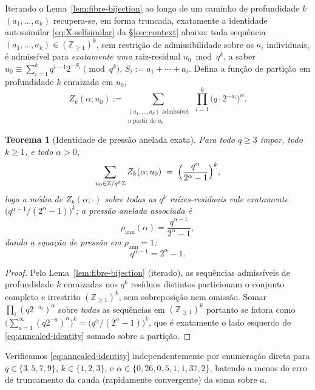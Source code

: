 \documentclass[11pt]{article}
\newtheorem{theorem}{Teorema}[section]
\theoremstyle{definition}
\theoremstyle{remark}
\begin{document}
Iterando o Lema~\ref{lem:fibre-bijection} ao longo de um caminho de
profundidade $k$ $(a_1,\dots,a_k)$ recupera-se, em forma truncada,
exatamente a identidade autossimilar \eqref{eq:X-selfsimilar} da
\S\ref{sec:context} abaixo: toda sequência
$(a_1,\dots,a_k)\in(\mathbb{Z}_{\ge1})^k$, sem restrição de
admissibilidade sobre os $a_i$ individuais, é admissível para
\emph{exatamente uma} raiz-residual $u_0\bmod q^k$, a saber
$u_0\equiv\sum_{i=1}^k q^{i-1}2^{-S_i}\pmod{q^k}$,
$S_i:=a_1+\cdots+a_i$. Defina a função de partição em profundidade $k$
enraizada em $u_0$,
\[
  Z_k(\alpha;u_0) := \sum_{\substack{(a_1,\dots,a_k)\text{ admissível}\\ \text{a partir de } u_0}} \ \prod_{i=1}^k \bigl(q\cdot2^{-a_i}\bigr)^\alpha .
\]

\begin{theorem}[Identidade de pressão anelada exata]\label{thm:pressure}
Para todo $q\ge3$ ímpar, todo $k\ge1$, e todo $\alpha>0$,
\begin{equation}\label{eq:annealed-identity}
  \sum_{u_0\in\mathbb{Z}/q^k\mathbb{Z}} Z_k(\alpha;u_0) \;=\; \Bigl(\frac{q^\alpha}{2^\alpha-1}\Bigr)^{k},
\end{equation}
logo a \emph{média} de $Z_k(\alpha;\cdot)$ sobre todas as $q^k$
raízes-residuais vale exatamente $\bigl(q^{\alpha-1}/(2^\alpha-1)\bigr)^k$;
a pressão anelada associada é
\begin{equation}\label{eq:pressure-closed-form}
  \rho_{\mathrm{ann}}(\alpha) = \frac{q^{\alpha-1}}{2^\alpha-1},
\end{equation}
dando a equação de pressão em $\rho_{\mathrm{ann}}=1$:
\begin{equation}\label{eq:pressure-eq}
  q^{\alpha-1} = 2^{\alpha}-1.
\end{equation}
\end{theorem}
\begin{proof}
Pelo Lema~\ref{lem:fibre-bijection} (iterado), as sequências
admissíveis de profundidade $k$ enraizadas nos $q^k$ resíduos distintos
particionam o conjunto completo e irrestrito $(\mathbb{Z}_{\ge1})^k$,
sem sobreposição nem omissão. Somar $\prod_i(q2^{-a_i})^\alpha$ sobre
\emph{todas} as sequências em $(\mathbb{Z}_{\ge1})^k$ portanto se
fatora como $\bigl(\sum_{a=1}^\infty (q2^{-a})^\alpha\bigr)^k =
\bigl(q^\alpha/(2^\alpha-1)\bigr)^k$, que é exatamente o lado esquerdo
de \eqref{eq:annealed-identity} somado sobre a partição.
\end{proof}

Verificamos \eqref{eq:annealed-identity} independentemente por
enumeração direta para $q\in\{3,5,7,9\}$, $k\in\{1,2,3\}$, e
$\alpha\in\{0{,}26,0{,}5,1,1{,}37,2\}$, batendo a menos do erro de
truncamento da cauda (rapidamente convergente) da soma sobre $a$.
\end{document}
